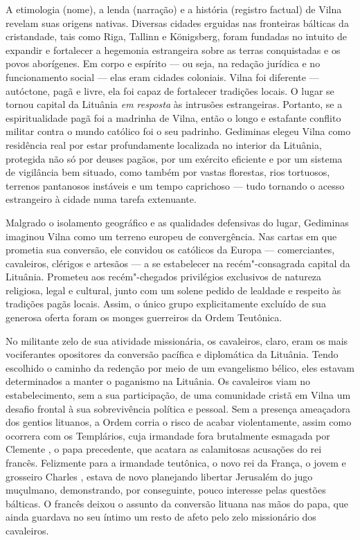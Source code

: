 A etimologia (nome), a lenda (narração) e a história (registro factual)
de Vilna revelam suas origens nativas. Diversas cidades erguidas nas
fronteiras bálticas da cristandade, tais como Riga, Tallinn e
Königsberg, foram fundadas no intuito de expandir e fortalecer a
hegemonia estrangeira sobre as terras conquistadas e os povos
aborígenes. Em corpo e espírito --- ou seja, na redação jurídica e no
funcionamento social --- elas eram cidades coloniais. Vilna foi diferente
--- autóctone, pagã e livre, ela foi capaz de fortalecer tradições locais.
O lugar se tornou capital da Lituânia \emph{em resposta} às intrusões
estrangeiras. Portanto, se a espiritualidade pagã foi a madrinha de
Vilna, então o longo e estafante conflito militar contra o mundo
católico foi o seu padrinho. Gediminas elegeu Vilna como residência real
por estar profundamente localizada no interior da Lituânia, protegida
não só por deuses pagãos, por um exército eficiente e por um sistema de
vigilância bem situado, como também por vastas florestas, rios
tortuosos, terrenos pantanosos instáveis e um tempo caprichoso --- tudo
tornando o acesso estrangeiro à cidade numa tarefa extenuante.

%

Malgrado o isolamento geográfico e as qualidades defensivas do lugar,
Gediminas imaginou Vilna como um terreno europeu de convergência. Nas
cartas em que prometia sua conversão, ele convidou os católicos da
Europa --- comerciantes, cavaleiros, clérigos e artesãos --- a se
estabelecer na recém"-consagrada capital da Lituânia. Prometeu aos
recém"-chegados privilégios exclusivos de natureza religiosa, legal e
cultural, junto com um solene pedido de lealdade e respeito às tradições
pagãs locais. Assim, o único grupo explicitamente excluído de sua
generosa oferta foram os monges guerreiros da Ordem Teutônica.

No militante zelo de sua atividade missionária, os cavaleiros, claro,
eram os mais vociferantes opositores da conversão pacífica e diplomática
da Lituânia. Tendo escolhido o caminho da redenção por meio de um
evangelismo bélico, eles estavam determinados a manter o paganismo na
Lituânia. Os cavaleiros viam no estabelecimento, sem a sua participação,
de uma comunidade cristã em Vilna um desafio frontal à sua sobrevivência
política e pessoal. Sem a presença ameaçadora dos gentios lituanos, a
Ordem corria o risco de acabar violentamente, assim como ocorrera com os
Templários, cuja irmandade fora brutalmente esmagada por Clemente , o
papa precedente, que acatara as calamitosas acusações do rei francês.
Felizmente para a irmandade teutônica, o novo rei da França, o jovem e
grosseiro Charles , estava de novo planejando libertar Jerusalém do
jugo muçulmano, demonstrando, por conseguinte, pouco interesse pelas
questões bálticas. O francês deixou o assunto da conversão lituana nas
mãos do papa, que ainda guardava no seu íntimo um resto de afeto pelo
zelo missionário dos cavaleiros.

